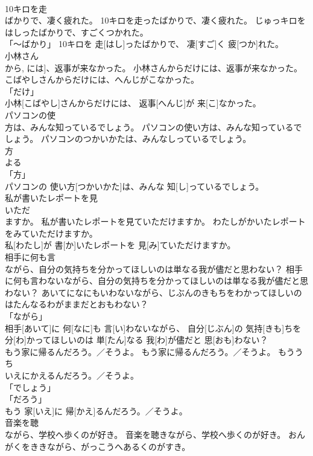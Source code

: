 \documentclass[8pt]{extreport}
\begin{document}
\begin{CJK}{UTF8}{min}
\\	10キロを走
\\	ばかりで、凄く疲れた。	10キロを走ったばかりで、凄く疲れた。	じゅっキロをはしったばかりで、すごくつかれた。	
\\	「～ばかり」	10キロを 走[はし]ったばかりで、 凄[すご]く 疲[つか]れた。		
\\	小林さん
\\	から, には]、返事が来なかった。	小林さんからだけには、返事が来なかった。	こばやしさんからだけには、へんじがこなかった。	
\\	「だけ」 
\\	小林[こばやし]さんからだけには、 返事[へんじ]が 来[こ]なかった。		
\\	パソコンの使
\\	方は、みんな知っているでしょう。	パソコンの使い方は、みんな知っているでしょう。	パソコンのつかいかたは、みんなしっているでしょう。	
\\	方 
\\	よる 
\\	「方」 
\\	パソコンの 使い方[つかいかた]は、みんな 知[し]っているでしょう。		
\\	私が書いたレポートを見
\\	いただ
\\	ますか。	私が書いたレポートを見ていただけますか。	わたしがかいたレポートをみていただけますか。	
\\	私[わたし]が 書[か]いたレポートを 見[み]ていただけますか。		
\\	相手に何も言
\\	ながら、自分の気持ちを分かってほしいのは単なる我が儘だと思わない？	相手に何も言わないながら、自分の気持ちを分かってほしいのは単なる我が儘だと思わない？	あいてになにもいわないながら、じぶんのきもちをわかってほしいのはたんなるわがままだとおもわない？	
\\	「ながら」 
\\	相手[あいて]に 何[なに]も 言[い]わないながら、 自分[じぶん]の 気持[きも]ちを 分[わ]かってほしいのは 単[たん]なる 我[わ]が儘だと 思[おも]わない？		
\\	もう家に帰るんだろう。／そうよ。	もう家に帰るんだろう。／そうよ。	もう{うち
\\	いえ}にかえるんだろう。／そうよ。	
\\	「でしょう」 
\\	「だろう」 
\\	もう 家[いえ]に 帰[かえ]るんだろう。／そうよ。		
\\	音楽を聴
\\	ながら、学校へ歩くのが好き。	音楽を聴きながら、学校へ歩くのが好き。	おんがくをききながら、がっこうへあるくのがすき。	

\end{CJK}
\end{document}
